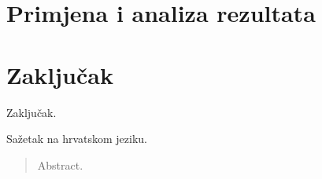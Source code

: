 \documentclass[times, utf8, zavrsni]{fer}
\begin{document}
\chapter{Primjena i analiza rezultata}

\chapter{Zaključak}
Zaključak.




\begin{sazetak}
Sažetak na hrvatskom jeziku.

\end{sazetak}

\begin{abstract}
Abstract.

\end{abstract}
\end{document}
